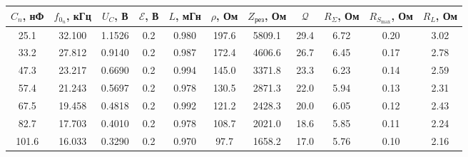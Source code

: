\begin{tabular}{ccccccccccc}
\toprule
$C_n$, нФ & $f_{0_n}$, кГц & $U_C$, В & $\mathscr{E}$, В & $L$, мГн & $\rho$, Ом & $Z_{\text{рез}}$, Ом & $\mathcal{Q}$ & $R_{\Sigma}$, Ом & $R_{S_{\text{max}}}$, Ом & $R_L$, Ом\\
\midrule
25.1  & 32.100 & 1.1526 & 0.2 & 0.980 & 197.6 & 5809.1 & 29.4 & 6.72 & 0.20 & 3.02 \\
33.2  & 27.812 & 0.9140 & 0.2 & 0.987 & 172.4 & 4606.6 & 26.7 & 6.45 & 0.17 & 2.78 \\
47.3  & 23.217 & 0.6690 & 0.2 & 0.994 & 145.0 & 3371.8 & 23.3 & 6.23 & 0.14 & 2.59 \\
57.4  & 21.243 & 0.5697 & 0.2 & 0.978 & 130.5 & 2871.3 & 22.0 & 5.94 & 0.13 & 2.31 \\
67.5  & 19.458 & 0.4818 & 0.2 & 0.992 & 121.2 & 2428.3 & 20.0 & 6.05 & 0.12 & 2.43 \\
82.7  & 17.703 & 0.4010 & 0.2 & 0.978 & 108.7 & 2021.0 & 18.6 & 5.85 & 0.11 & 2.24 \\
101.6 & 16.033 & 0.3290 & 0.2 & 0.970 &  97.7 & 1658.2 & 17.0 & 5.76 & 0.10 & 2.16 \\
\bottomrule
\end{tabular}